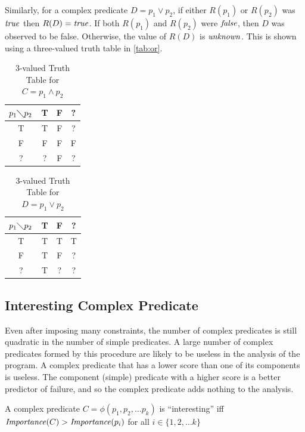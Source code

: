 Similarly, for a complex predicate $D = p_1 \vee p_2$, if either $R(p_1)$ or $R(p_2)$ was $\mathit{true}$ then $R(D) = \mathit{true}$.  If both $R(p_1)$ and $R(p_2)$ were $\mathit{false}$, then $D$ was observed to be false.  Otherwise, the value of $R(D)$ is $\mathit{unknown}$.  This is shown using a three-valued truth table in \autoref{tab:or}.

\begin{table}
  \caption{3-valued Truth Table for $C = p_1 \wedge p_2$}
  \label{tab:and}
  \centering
  \begin{tabular}{c|ccc}
    $p_1 \diagdown p_2$ & T & F & ? \\
    \hline
    T & T & F & ? \\
    F & F & F & F \\
    ? & ? & F & ? \\
  \end{tabular}
\end{table}


\begin{table}
  \caption{3-valued Truth Table for $D = p_1 \vee p_2$}
  \label{tab:or}
  \centering
  \begin{tabular}{c|ccc}
    $p_1 \diagdown p_2$ & T & F & ? \\
    \hline
    T & T & T & T \\
    F & T & F & ? \\
    ? & T & ? & ? \\
  \end{tabular}
\end{table}

\subsection{Interesting Complex Predicate}

Even after imposing many constraints, the number of complex predicates is still quadratic in the number of simple predicates.  A large number of complex predicates formed by this procedure are likely to be useless in the analysis of the program.  A complex predicate that has a lower score than one of its components is useless.  The component (simple) predicate with a higher score is a better predictor of failure, and so the complex predicate adds nothing to the analysis.

\begin{defn}
\label{dfn3}
A complex predicate $C = \phi(p_1, p_2, \ldots p_k)$ is ``interesting'' iff $\mathit{Importance}(C) > \mathit{Importance}(p_i)$ for all $i \in \{1, 2, \ldots k\}$
\end{defn}

